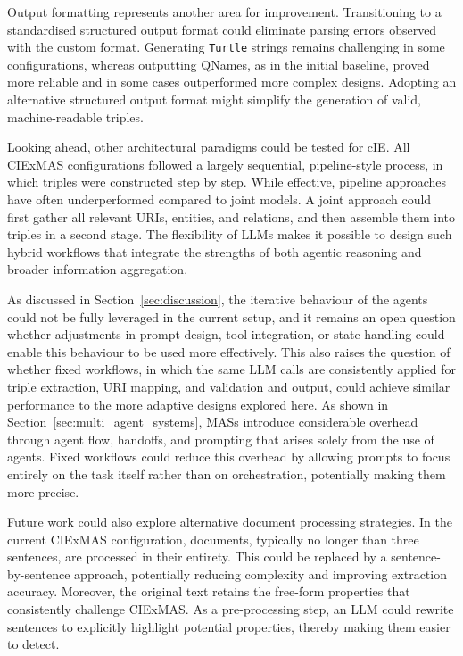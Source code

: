 \documentclass[a4paper,oneside,bibliography=totoc]{scrbook}
\begin{document}
Output formatting represents another area for improvement. Transitioning to a standardised structured output format could eliminate parsing errors observed with the custom format. Generating \texttt{Turtle} strings remains challenging in some configurations, whereas outputting QNames, as in the initial baseline, proved more reliable and in some cases outperformed more complex designs. Adopting an alternative structured output format might simplify the generation of valid, machine-readable triples.

Looking ahead, other architectural paradigms could be tested for \ac{cIE}. All CIExMAS configurations followed a largely sequential, pipeline-style process, in which triples were constructed step by step. While effective, pipeline approaches have often underperformed compared to joint models. A joint approach could first gather all relevant \acp{URI}, entities, and relations, and then assemble them into triples in a second stage. The flexibility of \acp{LLM} makes it possible to design such hybrid workflows that integrate the strengths of both agentic reasoning and broader information aggregation.

As discussed in Section~\ref{sec:discussion}, the iterative behaviour of the agents could not be fully leveraged in the current setup, and it remains an open question whether adjustments in prompt design, tool integration, or state handling could enable this behaviour to be used more effectively. This also raises the question of whether fixed workflows, in which the same \ac{LLM} calls are consistently applied for triple extraction, \ac{URI} mapping, and validation and output, could achieve similar performance to the more adaptive designs explored here. As shown in Section~\ref{sec:multi_agent_systems}, \acp{MAS} introduce considerable overhead through agent flow, handoffs, and prompting that arises solely from the use of agents. Fixed workflows could reduce this overhead by allowing prompts to focus entirely on the task itself rather than on orchestration, potentially making them more precise.

Future work could also explore alternative document processing strategies. In the current CIExMAS configuration, documents, typically no longer than three sentences, are processed in their entirety. This could be replaced by a sentence-by-sentence approach, potentially reducing complexity and improving extraction accuracy. Moreover, the original text retains the free-form properties that consistently challenge CIExMAS. As a pre-processing step, an \ac{LLM} could rewrite sentences to explicitly highlight potential properties, thereby making them easier to detect.
\end{document}
